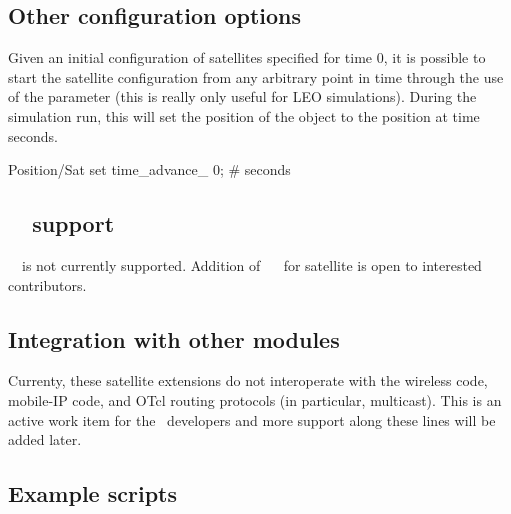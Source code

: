 
\subsection{Other configuration options}
\label{sec:satellite/usage/other}

Given an initial configuration of satellites specified for time $0$, 
it is possible to start the 
satellite configuration from any arbitrary point in time through the use of the
 parameter (this is really only useful for LEO
simulations). During the simulation run, this will set the position of 
the object to the position at time
 seconds.
\begin{program}
Position/Sat set time_advance_ 0; # seconds          
\end{program}



\subsection{\nam~~support}
\label{sec:satellite/usage/nam}
\nam~~is not currently supported.  Addition of \nam~~ for satellite
is open to interested contributors.


\subsection{Integration with other modules}
\label{sec:satellite/usage/integration}
Currenty, these satellite extensions do not interoperate with the wireless
code, mobile-IP code, and OTcl routing protocols (in particular, multicast).
This is an active work item for the \ns~developers and more support along
these lines will be added later.


\subsection{Example scripts}
\label{sec:satellite/usage/example}

